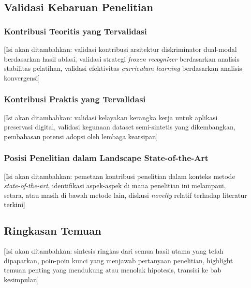 \documentclass[12pt,a4paper]{article}
\begin{document}
\vspace{0.8em}

\subsection{Validasi Kebaruan Penelitian}
\label{subsec:validasi-kebaruan}
\vspace{0.8em}

\subsubsection{Kontribusi Teoritis yang Tervalidasi}
\label{subsubsec:kontribusi-teoritis-tervalidasi}

[Isi akan ditambahkan: validasi kontribusi arsitektur diskriminator dual-modal berdasarkan hasil ablasi, validasi strategi \textit{frozen recognizer} berdasarkan analisis stabilitas pelatihan, validasi efektivitas \textit{curriculum learning} berdasarkan analisis konvergensi]

\vspace{0.8em}

\subsubsection{Kontribusi Praktis yang Tervalidasi}
\label{subsubsec:kontribusi-praktis-tervalidasi}

[Isi akan ditambahkan: validasi kelayakan kerangka kerja untuk aplikasi preservasi digital, validasi kegunaan dataset semi-sintetis yang dikembangkan, pembahasan potensi adopsi oleh lembaga kearsipan]

\vspace{0.8em}

\subsubsection{Posisi Penelitian dalam Landscape State-of-the-Art}
\label{subsubsec:posisi-penelitian}

[Isi akan ditambahkan: pemetaan kontribusi penelitian dalam konteks metode \textit{state-of-the-art}, identifikasi aspek-aspek di mana penelitian ini melampaui, setara, atau masih di bawah metode lain, diskusi \textit{novelty} relatif terhadap literatur terkini]

\vspace{0.8em}

\subsection{Ringkasan Temuan}
\label{subsec:ringkasan-temuan}
\vspace{0.8em}

[Isi akan ditambahkan: sintesis ringkas dari semua hasil utama yang telah dipaparkan, poin-poin kunci yang menjawab pertanyaan penelitian, highlight temuan penting yang mendukung atau menolak hipotesis, transisi ke bab kesimpulan]

\end{document}
